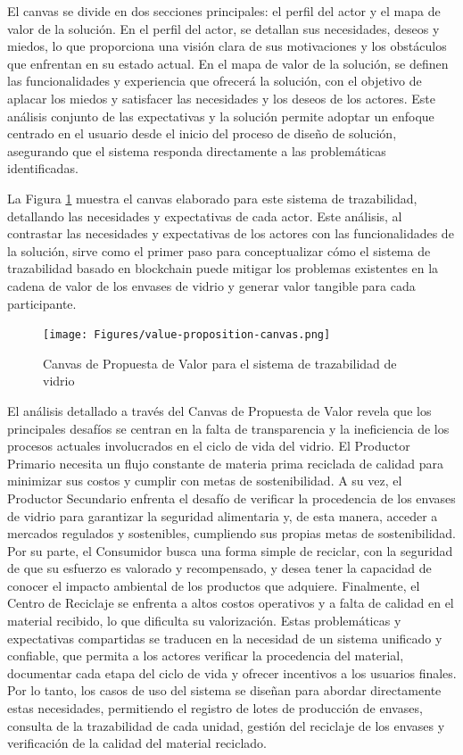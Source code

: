El canvas se divide en dos secciones principales: el perfil del actor y el mapa de valor de la solución. En el perfil del actor, se detallan sus necesidades, deseos y miedos, lo que proporciona una visión clara de sus motivaciones y los obstáculos que enfrentan en su estado actual. En el mapa de valor de la solución, se definen las funcionalidades y experiencia que ofrecerá la solución, con el objetivo de aplacar los miedos y satisfacer las necesidades y los deseos de los actores. Este análisis conjunto de las expectativas y la solución permite adoptar un enfoque centrado en el usuario desde el inicio del proceso de diseño de solución, asegurando que el sistema responda directamente a las problemáticas identificadas.

La Figura \ref{fig:value-proposition-canvas} muestra el canvas elaborado para este sistema de trazabilidad, detallando las necesidades y expectativas de cada actor. Este análisis, al contrastar las necesidades y expectativas de los actores con las funcionalidades de la solución, sirve como el primer paso para conceptualizar cómo el sistema de trazabilidad basado en blockchain puede mitigar los problemas existentes en la cadena de valor de los envases de vidrio y generar valor tangible para cada participante.

\begin{figure}[!htpb]
    \centering
    \texttt{[image: Figures/value-proposition-canvas.png]}
    \caption{Canvas de Propuesta de Valor para el sistema de trazabilidad de vidrio}
    \label{fig:value-proposition-canvas}
\end{figure}

El análisis detallado a través del Canvas de Propuesta de Valor revela que los principales desafíos se centran en la falta de transparencia y la ineficiencia de los procesos actuales involucrados en el ciclo de vida del vidrio. El Productor Primario necesita un flujo constante de materia prima reciclada de calidad para minimizar sus costos y cumplir con metas de sostenibilidad. A su vez, el Productor Secundario enfrenta el desafío de verificar la procedencia de los envases de vidrio para garantizar la seguridad alimentaria y, de esta manera, acceder a mercados regulados y sostenibles, cumpliendo sus propias metas de sostenibilidad. Por su parte, el Consumidor busca una forma simple de reciclar, con la seguridad de que su esfuerzo es valorado y recompensado, y desea tener la capacidad de conocer el impacto ambiental de los productos que adquiere. Finalmente, el Centro de Reciclaje se enfrenta a altos costos operativos y a falta de calidad en el material recibido, lo que dificulta su valorización. Estas problemáticas y expectativas compartidas se traducen en la necesidad de un sistema unificado y confiable, que permita a los actores verificar la procedencia del material, documentar cada etapa del ciclo de vida y ofrecer incentivos a los usuarios finales. Por lo tanto, los casos de uso del sistema se diseñan para abordar directamente estas necesidades, permitiendo el registro de lotes de producción de envases, consulta de la trazabilidad de cada unidad, gestión del reciclaje de los envases y verificación de la calidad del material reciclado.

